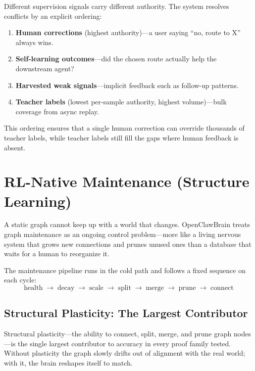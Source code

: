 \documentclass[11pt]{article}
\begin{document}
Different supervision signals carry different authority. The system resolves
conflicts by an explicit ordering:
\begin{enumerate}
  \item \textbf{Human corrections} (highest authority)---a user saying ``no,
        route to X'' always wins.
  \item \textbf{Self-learning outcomes}---did the chosen route actually help the
        downstream agent?
  \item \textbf{Harvested weak signals}---implicit feedback such as follow-up
        patterns.
  \item \textbf{Teacher labels} (lowest per-sample authority, highest
        volume)---bulk coverage from async replay.
\end{enumerate}
This ordering ensures that a single human correction can override thousands of
teacher labels, while teacher labels still fill the gaps where human feedback is
absent.

\section{RL-Native Maintenance (Structure Learning)}
\label{sec:structure}

A static graph cannot keep up with a world that changes. OpenClawBrain treats
graph maintenance as an ongoing control problem---more like a living nervous
system that grows new connections and prunes unused ones than a database that
waits for a human to reorganize it.

The maintenance pipeline runs in the cold path and follows a fixed sequence on
each cycle:
\[
\text{health} \;\to\; \text{decay} \;\to\; \text{scale} \;\to\; \text{split}
\;\to\; \text{merge} \;\to\; \text{prune} \;\to\; \text{connect}
\]

\subsection{Structural Plasticity: The Largest Contributor}
\label{sec:plasticity}

Structural plasticity---the ability to connect, split, merge, and prune graph
nodes---is the single largest contributor to accuracy in every proof family
tested. Without plasticity the graph slowly drifts out of alignment with the
real world; with it, the brain reshapes itself to match.
\end{document}
